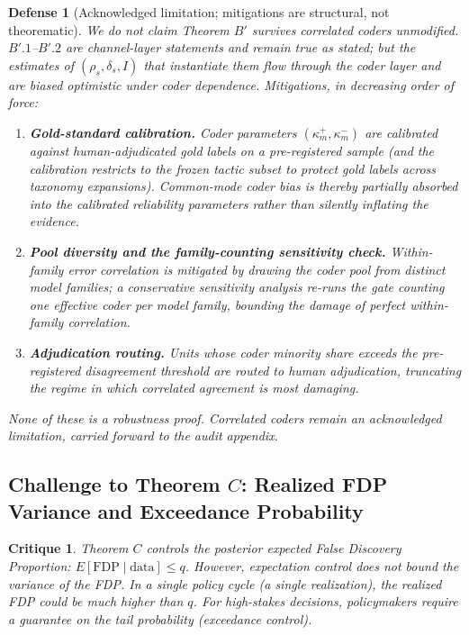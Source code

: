 \documentclass[11pt,a4paper]{article}
\newtheorem{critique}{Critique}
\newtheorem{defense}{Defense}
\begin{document}
\begin{defense}[Acknowledged limitation; mitigations are structural, not theorematic]
We do not claim Theorem $B'$ survives correlated coders unmodified. $B'.1$--$B'.2$ are channel-layer statements and remain true \emph{as stated}; but the estimates of $(\rho_s, \delta_s, I)$ that instantiate them flow through the coder layer and are biased optimistic under coder dependence. Mitigations, in decreasing order of force: %
\begin{enumerate}
    \item \textbf{Gold-standard calibration.} Coder parameters $(\kappa^+_m, \kappa^-_m)$ are calibrated against human-adjudicated gold labels on a pre-registered sample (and the calibration restricts to the frozen tactic subset to protect gold labels across taxonomy expansions). Common-mode coder bias is thereby partially absorbed into the calibrated reliability parameters rather than silently inflating the evidence. %
    \item \textbf{Pool diversity and the family-counting sensitivity check.} Within-family error correlation is mitigated by drawing the coder pool from distinct model families; a conservative sensitivity analysis re-runs the gate counting \emph{one effective coder per model family}, bounding the damage of perfect within-family correlation. %
    \item \textbf{Adjudication routing.} Units whose coder minority share exceeds the pre-registered disagreement threshold are routed to human adjudication, truncating the regime in which correlated agreement is most damaging.
\end{enumerate}
None of these is a robustness proof. Correlated coders remain an acknowledged limitation, carried forward to the audit appendix. %
\end{defense}

\subsection{Challenge to Theorem $C$: Realized FDP Variance and Exceedance Probability}
\begin{critique}
Theorem $C$ controls the posterior expected False Discovery Proportion: $E[\text{FDP} \mid \text{data}] \le q$. However, expectation control does not bound the variance of the FDP. In a single policy cycle (a single realization), the realized FDP could be much higher than $q$. For high-stakes decisions, policymakers require a guarantee on the tail probability (exceedance control).
\end{critique}
\end{document}
